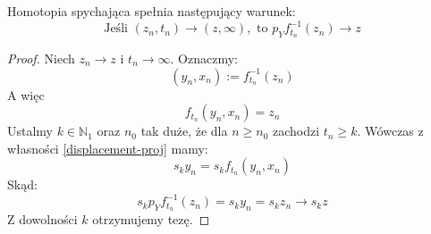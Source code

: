\begin{prop}
  Homotopia spychająca spełnia następujący warunek:
  $$\mbox{Jeśli }	(z_n, t_n) \rightarrow (z, \infty), \mbox{ to } p_Y f_{t_n}^{-1}(z_n) \rightarrow z$$
  \begin{proof}
    Niech $z_n \rightarrow z$ i $t_n \rightarrow \infty$. Oznaczmy:
    $$(y_n, x_n) := f_{t_n}^{-1}(z_n)$$
    A więc
    $$f_{t_n}(y_n, x_n) = z_n$$
    Ustalmy $k \in \mathbb{N}_1$ oraz $n_0$ tak duże, że dla $n \geq n_0$ zachodzi $t_n \geq k$. Wówczas z własności \ref{displacement-proj} mamy:
    $$s_k y_n = s_k f_{t_n}(y_n, x_n)$$
    Skąd:
    $$s_k p_Y f_{t_n}^{-1}(z_n) = s_k y_n = s_k z_n \rightarrow s_k z$$
    Z dowolności $k$ otrzymujemy tezę.
  \end{proof}
\end{prop}

